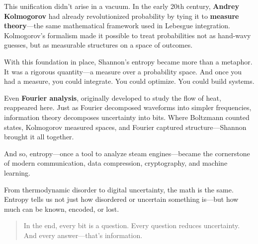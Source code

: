 This unification didn’t arise in a vacuum. In the early 20th century, \textbf{Andrey Kolmogorov} had already revolutionized probability by tying it to \textbf{measure theory}—the same mathematical framework used in Lebesgue integration. Kolmogorov’s formalism made it possible to treat probabilities not as hand-wavy guesses, but as measurable structures on a space of outcomes.

With this foundation in place, Shannon’s entropy became more than a metaphor. It was a rigorous quantity—a measure over a probability space. And once you had a measure, you could integrate. You could optimize. You could build systems.

Even \textbf{Fourier analysis}, originally developed to study the flow of heat, reappeared here. Just as Fourier decomposed waveforms into simpler frequencies, information theory decomposes uncertainty into bits. Where Boltzmann counted states, Kolmogorov measured spaces, and Fourier captured structure—Shannon brought it all together.

And so, entropy—once a tool to analyze steam engines—became the cornerstone of modern communication, data compression, cryptography, and machine learning.

From thermodynamic disorder to digital uncertainty, the math is the same. Entropy tells us not just how disordered or uncertain something is—but how much can be known, encoded, or lost.

\begin{quote}
In the end, every bit is a question. Every question reduces uncertainty. And every answer—that’s information.
\end{quote}




